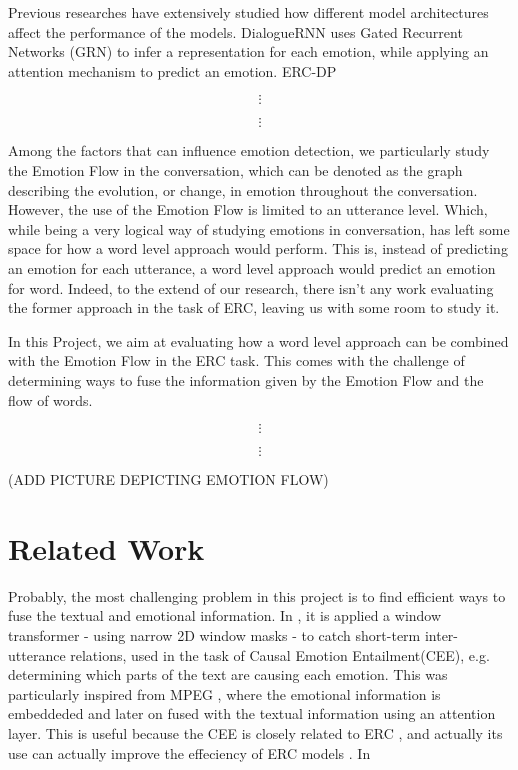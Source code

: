 \documentclass[oneside, a4paper, onecolumn, 11pt]{article}
\begin{document}
Previous researches have extensively studied how different model architectures affect the performance of the models. 
DialogueRNN \cite{majumder2019dialoguernnattentivernnemotion} uses Gated Recurrent Networks (GRN) to infer a representation for 
each emotion, while applying an attention mechanism to predict an emotion. ERC-DP \cite{wang2021t2vladgloballocalsequencealignment} 


$$\vdots$$

$$\vdots$$

Among the factors that can influence emotion detection, we particularly study the Emotion Flow in the conversation, which can be
denoted as the graph describing the evolution, or change, in emotion throughout the conversation. However, the use of the Emotion 
Flow is limited to an utterance level. Which, while being a very logical way of studying emotions in conversation, has left some 
space for how a word level approach would perform. This is, instead of predicting an emotion for each utterance, a word level approach 
would predict an emotion for word. Indeed, to the extend of our research, there isn't any work evaluating the former approach in the 
task of ERC, leaving us with some room to study it.

In this Project, we aim at evaluating how a word level approach can be combined with the Emotion Flow in the ERC task. This comes with 
the challenge of determining ways to fuse the information given by the Emotion Flow and the flow of words. 

$$\vdots$$

$$\vdots$$

(ADD PICTURE DEPICTING EMOTION FLOW)

\section{Related Work} 
Probably, the most challenging problem in this project is to find efficient ways to fuse the textual and emotional information. 
In \cite{LIU2025126924}, it is applied a window transformer - using narrow 2D window masks - to catch short-term inter-utterance relations, 
used in the task of Causal Emotion Entailment(CEE), e.g. determining which parts of the text are causing each emotion. This was 
particularly inspired from MPEG \cite{10252019}, where the emotional information is embeddeded and later on fused with the textual 
information using an attention layer. This is useful because the CEE is closely related to ERC , and actually its use can actually 
improve the effeciency of ERC models \cite{LIU2025126924}. In 
\end{document}
